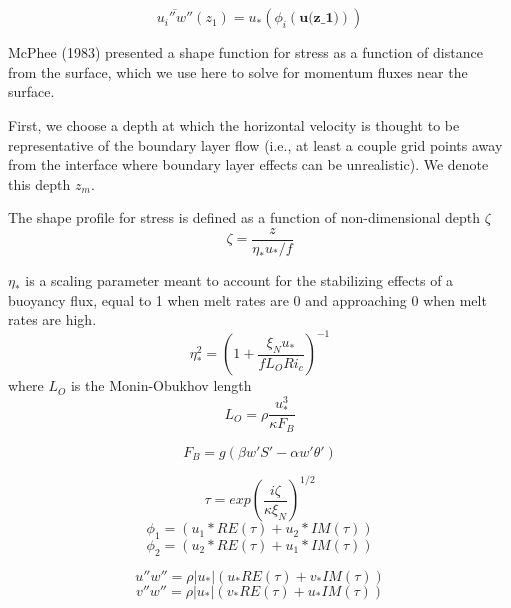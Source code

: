 
\begin{equation*}
\overline{u_i''w''}(z_1) = u_* (\phi_i(\textbf{u(z_1)}))
\end{equation*}

McPhee (1983) presented a shape function for stress as a function of distance from the surface, which we use here to solve for momentum fluxes near the surface. 

First, we choose a depth at which the horizontal velocity is thought to be representative of the boundary layer flow (i.e., at least a couple grid points away from the interface where boundary layer effects can be unrealistic). We denote this depth $z_m$. 

The shape profile for stress is defined as a function of non-dimensional depth $\zeta$
\begin{equation}
    \zeta = \frac{z}{\eta_* u_*/f}
\end{equation}

$\eta_*$ is a scaling parameter meant to account for the stabilizing effects of a buoyancy flux, equal to 1 when melt rates are 0 and approaching 0 when melt rates are high.
\begin{equation}
    \eta_*^2 = (1+\frac{\xi_N u_*}{f L_O Ri_c})^{-1}
\end{equation}
where $L_O$ is the Monin-Obukhov length
\begin{equation}
    L_O = \rho \frac{u_*^3}{\kappa F_B}
\end{equation}

\begin{equation}
F_B = g(\beta w'S' - \alpha w'\theta')
\end{equation}

\begin{equation}
    \tau = exp(\frac{i \zeta}{\kappa \xi_N})^{1/2}
\end{equation}
\begin{equation}
    \phi_1 = (u_1* RE(\tau) + u_2* IM(\tau))
\end{equation}
\begin{equation}
    \phi_2 = (u_2* RE(\tau) + u_1* IM(\tau))
\end{equation}

\begin{equation}
    u''w'' = \rho |u_*| (u_* RE(\tau) + v_* IM(\tau))
\end{equation}
\begin{equation}
    v''w'' = \rho |u_*|(v_* RE(\tau) + u_* IM(\tau))
\end{equation}

